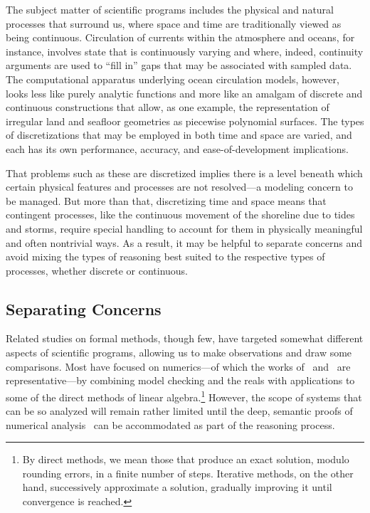 \documentclass[11pt]{article}
\begin{document}
The subject matter of scientific programs includes the physical and
natural processes that surround us, where space and time are
traditionally viewed as being continuous.  Circulation of currents
within the atmosphere and oceans, for instance, involves state
that is continuously varying and where, indeed, continuity arguments
are used to ``fill in'' gaps that may be associated with sampled data.
The computational apparatus underlying ocean circulation models,
however, looks less like purely analytic functions and more like an
amalgam of discrete and continuous constructions that allow, as one
example, the representation of irregular land and seafloor geometries
as piecewise polynomial surfaces.  The types of discretizations that
may be employed in both time and space are varied, and each has its
own performance, accuracy, and ease-of-development implications.

That problems such as these are discretized implies there is a level
beneath which certain physical features and processes are not
resolved---a modeling concern to be managed.  But more than that,
discretizing time and space means that contingent processes, like the
continuous movement of the shoreline due to tides and storms, require
special handling to account for them in physically meaningful and
often nontrivial ways.  As a result, it may be helpful to separate
concerns and avoid mixing the types of reasoning best suited to the
respective types of processes, whether discrete or continuous.

\subsection{Separating Concerns}

\def\direct{By direct methods, we mean those that produce an exact
  solution, modulo rounding errors, in a finite number of steps.
  Iterative methods, on the other hand, successively approximate a
  solution, gradually improving it until convergence is reached.}

Related studies on formal methods, though few, have targeted somewhat
different aspects of scientific programs, allowing us to make
observations and draw some comparisons.  Most have focused on
numerics---of which the works of~\cite{bientinesi2005} and~\cite{siegel2008} are
representative---by combining model checking and the reals with
applications to some of the direct methods of linear
algebra.\footnote{\direct} However, the scope of systems that can be
so analyzed will remain rather limited until the deep, semantic proofs
of numerical analysis~\citep{linz1988} can be accommodated as part of
the reasoning process.
\end{document}
